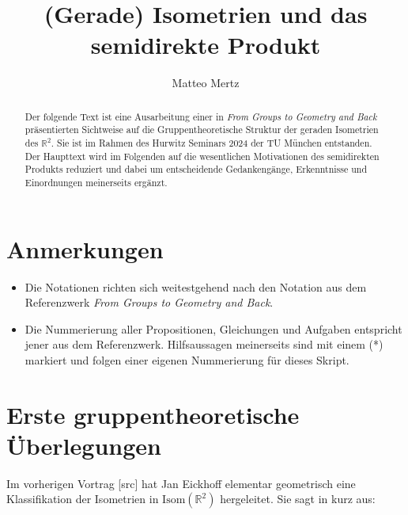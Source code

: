 \documentclass[a4paper, ngerman]{article}
\title{(Gerade) Isometrien und das semidirekte Produkt}
\author{Matteo Mertz}
\numberwithin{equation}{chapter}
\theoremstyle{plain}
\theoremstyle{definition}
\newcommand{\anm}[1]{{\color{red} #1}}
\begin{document}
\setcounter{proposition}{7}

\maketitle

\begin{abstract}
    Der folgende Text ist eine Ausarbeitung einer in \textit{From Groups to Geometry and Back} präsentierten Sichtweise auf die Gruppentheoretische Struktur der geraden Isometrien des \(\mathbb R^2\). Sie ist im Rahmen des Hurwitz Seminars 2024 der TU München entstanden. Der Haupttext wird im Folgenden auf die wesentlichen Motivationen des semidirekten Produkts reduziert und dabei um entscheidende Gedankengänge, Erkenntnisse und Einordnungen meinerseits ergänzt.  
\end{abstract}

\section*{Anmerkungen}
\begin{itemize}
    \item Die Notationen richten sich weitestgehend nach den Notation aus dem Referenzwerk \textit{From Groups to Geometry and Back}. 
    \item Die Nummerierung aller Propositionen, Gleichungen und Aufgaben entspricht jener aus dem Referenzwerk. Hilfsaussagen meinerseits sind mit einem (*) markiert und folgen einer eigenen Nummerierung für dieses Skript. 
\end{itemize}

\section{Erste gruppentheoretische Überlegungen}\label{sec:wiederholung}
Im vorherigen Vortrag \anm{[src]} hat Jan Eickhoff elementar geometrisch eine Klassifikation der Isometrien in \(\mathrm{Isom}(\mathbb R^2)\) hergeleitet. Sie sagt in kurz aus: 
\end{document}

